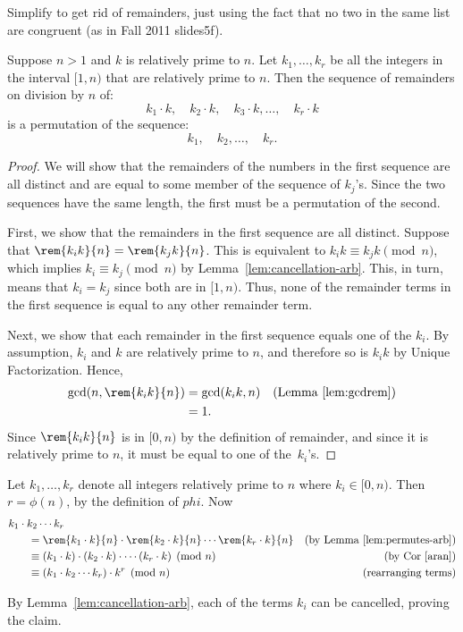 \begin{editingnotes}

Simplify to get rid of remainders, just using the fact that no two in
the same list are congruent (as in Fall 2011 slides5f).

\begin{lemma} \label{lem:permutes-arb}
Suppose $n>1$ and $k$ is relatively prime to $n$.
Let $k_1, \dots, k_r$ be all the integers in the interval
$[1,n)$ that are relatively prime to $n$.  Then the sequence of
  remainders on division by $n$ of:
\[
k_1 \cdot k,\quad
k_2 \cdot k,\quad
k_3 \cdot k, \dots,\quad
k_r \cdot k
\]
is a permutation of the sequence:
\[
k_1,\quad k_2, \dots,\quad k_r.
\]
\end{lemma}

\begin{proof}
We will show that the remainders of the numbers in the first sequence
are all distinct and are equal to some member of the sequence of
$k_j$'s.  Since the two sequences have the same length, the first must
be a permutation of the second.

First, we show that the remainders in the first sequence are all
distinct.  Suppose that $\rem{k_i k}{n} = \rem{k_j k}{n}$.  This is
equivalent to $k_i k \equiv k_j k \pmod{n}$, which implies $k_i \equiv
k_j \pmod{n}$ by Lemma~\ref{lem:cancellation-arb}.  This, in turn,
means that $k_i = k_j$ since both are in $[1,n)$.  Thus, none
of the remainder terms in the first sequence is equal to any other
remainder term.

Next, we show that each remainder in the first sequence equals one of
the $k_i$.  By assumption, $k_i$ and $k$ are relatively prime to $n$,
and therefore so is $k_ik$ by Unique Factorization.  Hence,
\begin{align*}
\gcd(n, \rem{k_i k}{n}) & = \gcd(k_i k, n)
            & \text{(Lemma~\ref{lem:gcdrem})}\\
      & = 1.
\end{align*}
Since $\rem{k_i k}{n}$ is in $[0, n)$ by the definition of remainder,
  and since it is relatively prime to $n$, it must be equal to one of
  the~$k_i$'s.
\end{proof}

Let $k_1, \dots, k_r$ denote all integers relatively prime to $n$
where $ k_i\in [0, n)$.  Then $r = \phi(n)$, by the definition of
  $phi$.  Now
\begin{align*}
\lefteqn{k_1 \cdot k_2 \cdots k_r} \hspace{0.25in} \\
  & = \rem{k_1 \cdot k}{n} \cdot \rem{k_2 \cdot k}{n} \cdots \rem{k_r \cdot k}{n}
      & \text{(by Lemma~\ref{lem:permutes-arb})}\\
  & \equiv (k_1 \cdot k) \cdot (k_2 \cdot k) \cdot \cdots (k_r \cdot k) \pmod{n}
      & \text{(by Cor~\ref{aran})}\\
  & \equiv (k_1 \cdot k_2 \cdots k_r) \cdot k^r \pmod{n}
      & \text{(rearranging terms)}
\end{align*}

By Lemma~\ref{lem:cancellation-arb}, each of the terms $k_i$ can be
cancelled, proving the claim.
\end{editingnotes}

